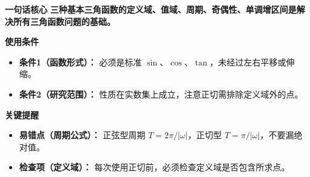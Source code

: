 \begin{summarybox}
	\textbf{\textcolor{CSummary}{一句话核心}}
	\textbf{三种基本三角函数的定义域、值域、周期、奇偶性、单调增区间是解决所有三角函数问题的基础。}

	\medskip
	\textbf{\textcolor{CSummary}{使用条件}}
	\begin{itemize}[leftmargin=*, itemsep=0.5em, topsep=0.4em]
		\item \textbf{条件1（函数形式）：} 必须是标准 $\sin$、$\cos$、$\tan$，未经过左右平移或伸缩。
		\item \textbf{条件2（研究范围）：} 性质在实数集上成立，注意正切需排除定义域外的点。
	\end{itemize}

	\medskip
	\textbf{\textcolor{CSummary}{关键提醒}}
	\begin{itemize}[leftmargin=*, itemsep=0.5em, topsep=0.4em]
		\item \textbf{易错点（周期公式）：} 正弦型周期 $T=2\pi/|\omega|$，正切型 $T=\pi/|\omega|$，不要漏绝对值。
		\item \textbf{检查项（定义域）：} 每次使用正切前，必须检查定义域是否包含所求点。
	\end{itemize}

\end{summarybox}
